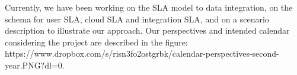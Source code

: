 \documentclass[11pt,a4paper,oneside]{report}
\begin{document}
Currently, we have been working on the SLA model to data integration, on the schema for user SLA, cloud SLA and integration SLA, and on a scenario description to illustrate our approach.
Our perspectives and intended calendar considering the project are described in the figure: \\ https://www.dropbox.com/s/risn3fo2ostgrbk/calendar-perspectives-second-year.PNG?dl=0. 


 
\end{document}
